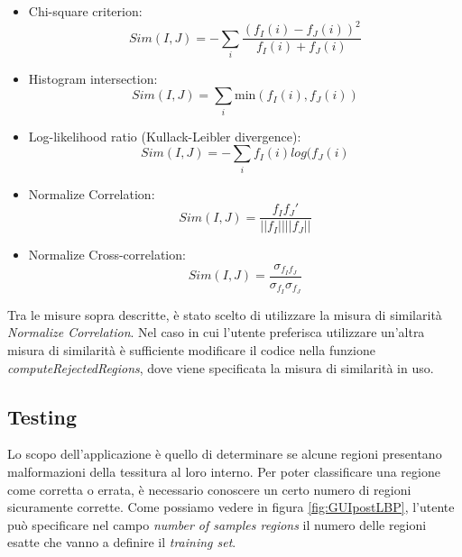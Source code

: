 \begin{itemize}

\item Chi-square criterion:
\begin{equation}
Sim(I, J) = -  \sum_{i} \frac{ (f_{I}(i) - f_{J}(i) )^2}{f_{I}(i) + f_{J}(i)}
\end{equation}

\item Histogram intersection:
\begin{equation}
Sim(I, J) = \sum_{i} \mbox{min}(f_{I}(i),f_{J}(i))
\end{equation}

\item Log-likelihood ratio (Kullack-Leibler 
divergence):
\begin{equation}
Sim(I, J) = - \sum_{i} f_{I}(i)log(f_{J}(i)
\end{equation}

\item Normalize Correlation:
\begin{equation}
Sim(I, J) = \frac{f_{I}f_{J}'}{||f_{I}|| ||f_{J}||}
\end{equation}

\item Normalize Cross-correlation:
\begin{equation}
Sim(I, J) = \frac{\sigma_{f_{I}f_{J}}}{\sigma_{f_{I}}\sigma_{f_{J}}}
\end{equation}


\end{itemize}

Tra le misure sopra descritte, è stato scelto di utilizzare la misura di similarità \textit{Normalize Correlation}. Nel caso in cui l'utente preferisca utilizzare un'altra misura di similarità è sufficiente modificare il codice nella funzione \textit{computeRejectedRegions}, dove viene specificata la misura di similarità in uso.



\pagebreak
\subsection{Testing}

Lo scopo dell'applicazione è quello di determinare se alcune regioni presentano malformazioni della tessitura al loro interno. Per poter classificare una regione come corretta o errata, è necessario conoscere un certo numero di regioni sicuramente corrette. Come possiamo vedere in figura \ref{fig:GUIpostLBP}, l'utente può specificare nel campo \textit{number of samples regions} il numero delle regioni esatte che vanno a definire il \textit{training set}.

